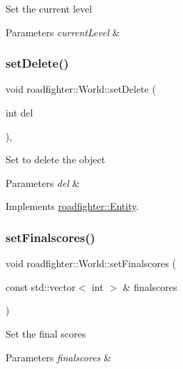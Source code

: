 Set the current level 
\begin{DoxyParams}{Parameters}
{\em current\+Level} & \\
\hline
\end{DoxyParams}
\mbox{\label{classroadfighter_1_1World_a78c860f6700cd7f8e47994c02e7fd181}} 
\subsubsection{\texorpdfstring{set\+Delete()}{setDelete()}}
{\footnotesize\ttfamily void roadfighter\+::\+World\+::set\+Delete (\begin{DoxyParamCaption}\item[{int}]{del }\end{DoxyParamCaption})\hspace{0.3cm}{\ttfamily [override]}, {\ttfamily [virtual]}}

Set to delete the object 
\begin{DoxyParams}{Parameters}
{\em del} & \\
\hline
\end{DoxyParams}


Implements \hyperlink{classroadfighter_1_1Entity_a07e973f0fa941a69e749629716877692}{roadfighter\+::\+Entity}.

\mbox{\label{classroadfighter_1_1World_a8cbfe6306f4c9f0883aed112d9b1609d}} 
\subsubsection{\texorpdfstring{set\+Finalscores()}{setFinalscores()}}
{\footnotesize\ttfamily void roadfighter\+::\+World\+::set\+Finalscores (\begin{DoxyParamCaption}\item[{const std\+::vector$<$ int $>$ \&}]{finalscores }\end{DoxyParamCaption})}

Set the final scores 
\begin{DoxyParams}{Parameters}
{\em finalscores} & \\
\hline
\end{DoxyParams}
\mbox{\label{classroadfighter_1_1World_a9ea901a6a9dc45e7d757c15e0e6368c0}} 
